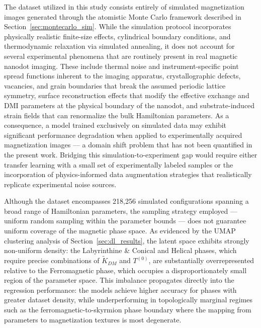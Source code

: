 \documentclass[a4paper,fleqn]{cas-sc}
\begin{document}
The dataset utilized in this study consists entirely 
of simulated magnetization images generated through 
the atomistic Monte Carlo framework described in 
Section~\ref{sec:montecarlo_sim}. While the 
simulation protocol incorporates physically realistic 
finite-size effects, cylindrical boundary conditions, 
and thermodynamic relaxation via simulated annealing, 
it does not account for several experimental 
phenomena that are routinely present in real magnetic 
nanodot imaging. These include thermal noise and 
instrument-specific point spread functions inherent 
to the imaging apparatus, crystallographic defects, 
vacancies, and grain boundaries that break the 
assumed periodic lattice symmetry, surface 
reconstruction effects that modify the effective 
exchange and DMI parameters at the physical boundary 
of the nanodot, and substrate-induced strain fields 
that can renormalize the bulk Hamiltonian parameters. 
As a consequence, a model trained exclusively on 
simulated data may exhibit significant performance 
degradation when applied to experimentally acquired 
magnetization images --- a domain shift problem 
that has not been quantified in the present work. 
Bridging this simulation-to-experiment gap would 
require either transfer learning with a small set 
of experimentally labeled samples or the 
incorporation of physics-informed data augmentation 
strategies that realistically replicate experimental 
noise sources.

Although the dataset encompasses 218,256 simulated 
configurations spanning a broad range of Hamiltonian 
parameters, the sampling strategy employed --- 
uniform random sampling within the parameter 
bounds --- does not guarantee uniform coverage of 
the magnetic phase space. As evidenced by the UMAP 
clustering analysis of Section~\ref{sec:dl_results}, 
the latent space exhibits strongly non-uniform 
density: the Labyrinthine \& Conical and Helical 
phases, which require precise combinations of 
$\tilde{K}_{DM}$ and $T^{(0)}$, are substantially 
overrepresented relative to the Ferromagnetic phase, 
which occupies a disproportionately small region of 
the parameter space. This imbalance propagates 
directly into the regression performance: the models 
achieve higher accuracy for phases with greater 
dataset density, while underperforming in 
topologically marginal regimes such as the 
ferromagnetic-to-skyrmion phase boundary where 
the mapping from parameters to magnetization 
textures is most degenerate.
\end{document}
